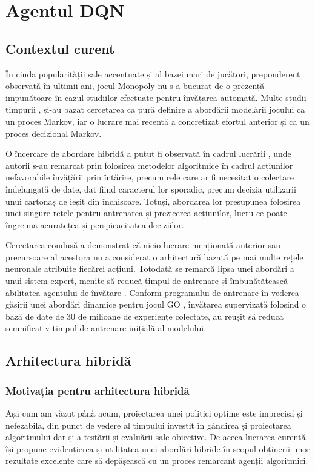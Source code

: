 \chapter{Agentul DQN}

\section{Contextul curent}
În ciuda popularității sale accentuate și al bazei mari de jucători, preponderent observată în ultimii ani, jocul Monopoly nu s-a bucurat de o prezență impunătoare în cazul studiilor efectuate pentru învățarea automată. Multe studii timpurii \cite{mdp_monopoly_1}, \cite{mdp_monopoly_2} și-au bazat cercetarea ca pură definire a abordării modelării jocului ca un proces Markov, iar o lucrare mai recentă \cite{mdp_monopoly_3} a concretizat efortul anterior și ca un proces decizional Markov.

O încercare de abordare hibridă a putut fi observată în cadrul lucrării \cite{hybrid_monopoly}, unde autorii s-au remarcat prin folosirea metodelor algoritmice în cadrul acțiunilor nefavorabile învățării prin întărire, precum cele care ar fi necesitat o colectare îndelungată de date, dat fiind caracterul lor sporadic, precum decizia utilizării unui cartonaș de ieșit din închisoare. Totuși, abordarea lor presupunea folosirea unei singure rețele pentru antrenarea și prezicerea acțiunilor, lucru ce poate îngreuna acuratețea și perspicacitatea deciziilor.

Cercetarea condusă a demonstrat că nicio lucrare menționată anterior sau precursoare al acestora nu a considerat o arhitectură bazată pe mai multe rețele neuronale atribuite fiecărei acțiuni. Totodată se remarcă lipsa unei abordări a unui sistem expert, menite să reducă timpul de antrenare și îmbunătățească abilitatea agentului de învățare \cite{expert_learning}. Conform programului de antrenare în vederea găsirii unei abordări dinamice pentru jocul GO \cite{alphago}, învățarea supervizată folosind o bază de date de 30 de milioane de experiențe colectate, au reușit să reducă semnificativ timpul de antrenare inițială al modelului.

\section{Arhitectura hibridă}
\subsection{Motivația pentru arhitectura hibridă}
Așa cum am văzut până acum, proiectarea unei politici optime este imprecisă și nefezabilă, din punct de vedere al timpului investit în gândirea și proiectarea algoritmului dar și a testării și evaluării sale obiective. De aceea lucrarea curentă își propune evidențierea și utilitatea unei abordări hibride în scopul obținerii unor rezultate excelente care să depășească cu un proces remarcant agenții algoritmici.

